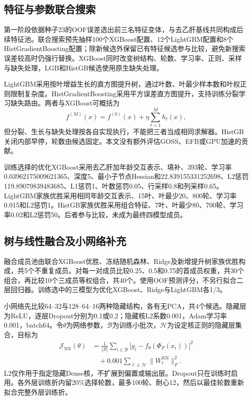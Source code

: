 \subsection{特征与参数联合搜索}
第一阶段依据种子23的OOF误差选出前三名特征变体，与去乙肝基线共同构成后续特征池。联合搜索预先抽样100个XGBoost配置、12个LightGBM配置和8个HistGradientBoosting配置；除新候选外保留已有特征候选参与比较，避免新搜索误差较高时仍强行替换。XGBoost同时改变树结构、轮数、学习率、正则、采样与缺失处理，LGB和HistGB候选使用原生缺失处理。

LightGBM采用按叶增益生长的直方图提升树\cite{lightgbm}，通过叶数、叶最少样本数和叶权正则限制复杂度\cite{lgb-tuning}。HistGradientBoosting采用平方误差直方图提升，支持训练分裂学习缺失路由\cite{hist}。两者与XGBoost可概括为
\begin{equation}
f^{(M)}(x)=f^{(0)}(x)+\eta\sum_{t=1}^{M}h_t(x),
\label{eq:additive}
\end{equation}
但分裂、生长与缺失处理按各自实现执行，不能把三者当成相同求解器。HistGB关闭内部早停，轮数由候选固定。本文没有额外评估GOSS、EFB或GPU加速的贡献。

训练选择的优化XGBoost采用去乙肝加年龄交互表示、填补、393轮、学习率0.03962175009621365、深度5、最小子节点Hessian和22.839155331252698、L2惩罚119.89079839483685、L1惩罚1、叶数惩罚0.05、行采样0.8和列采样0.65。LightGBM家族优胜采用相同年龄交互表示、15叶、叶最少20、800轮、学习率0.015和L2惩罚1。HistGB家族优胜采用组合特征、7叶、叶最少80、700轮、学习率0.02和L2惩罚50。后者参与比较，未成为最终四模型成员。

\subsection{树与线性融合及小网络补充}
融合成员池由联合XGBoost优胜、冻结随机森林、Ridge及新增提升树家族优胜构成，共5个不重复成员。对每一对成员比较0.25、0.5和0.75的首成员权重，共30个组合，再比较10个三成员等权组合，共40个。使用OOF预测评分，不另行拟合二层回归器。训练选中的三模型为优化XGBoost、Ridge与LightGBM各1/3。

小网络先比较64--32与128--64--16两种隐藏结构，各有无PCA，共4个候选。隐藏层为ReLU，逐层Dropout分别为0.1或0.2；隐藏核L2系数0.001，Adam学习率0.001，batch64。令$\theta$为网络参数，$\mathcal B$为训练小批次，$\mathcal H$为设定核正则的隐藏层集合，目标为
\begin{equation}
\begin{aligned}
\mathcal J_{\mathrm{NN}}(\theta)&=\frac1{|\mathcal B|}\sum_{i\in\mathcal B}
\bigl[y_i-f_\theta(\Phi_F(x_i))\bigr]^2\\
{}&\quad+0.001\sum_{\ell\in\mathcal H}\|W_\ell^{\mathrm{NN}}\|_F^2.
\end{aligned}
\label{eq:smallnn}
\end{equation}
L2仅作用于指定隐藏Dense核，不扩展到偏置或输出层。Dropout只在训练时启用。各外层训练折内留20\%选择轮数，最多100轮、耐心12，然后以最佳轮数重新拟合完整外层训练折。

